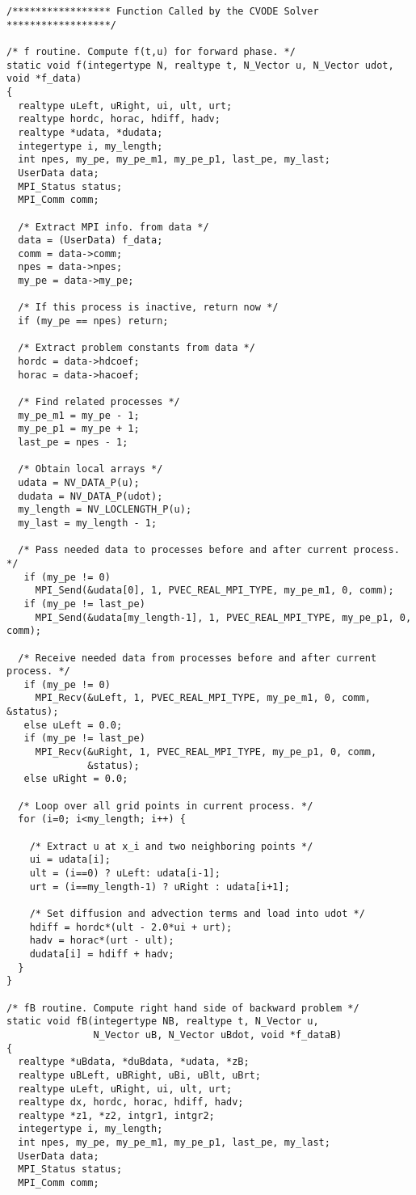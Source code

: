 \begin{verbatim}
/***************** Function Called by the CVODE Solver ******************/

/* f routine. Compute f(t,u) for forward phase. */
static void f(integertype N, realtype t, N_Vector u, N_Vector udot, void *f_data)
{
  realtype uLeft, uRight, ui, ult, urt;
  realtype hordc, horac, hdiff, hadv;
  realtype *udata, *dudata;
  integertype i, my_length;
  int npes, my_pe, my_pe_m1, my_pe_p1, last_pe, my_last;
  UserData data;
  MPI_Status status;
  MPI_Comm comm;

  /* Extract MPI info. from data */
  data = (UserData) f_data;
  comm = data->comm;
  npes = data->npes;
  my_pe = data->my_pe;
  
  /* If this process is inactive, return now */
  if (my_pe == npes) return;

  /* Extract problem constants from data */
  hordc = data->hdcoef;
  horac = data->hacoef;

  /* Find related processes */
  my_pe_m1 = my_pe - 1;
  my_pe_p1 = my_pe + 1;
  last_pe = npes - 1;

  /* Obtain local arrays */
  udata = NV_DATA_P(u);
  dudata = NV_DATA_P(udot);
  my_length = NV_LOCLENGTH_P(u);
  my_last = my_length - 1;

  /* Pass needed data to processes before and after current process. */
   if (my_pe != 0)
     MPI_Send(&udata[0], 1, PVEC_REAL_MPI_TYPE, my_pe_m1, 0, comm);
   if (my_pe != last_pe)
     MPI_Send(&udata[my_length-1], 1, PVEC_REAL_MPI_TYPE, my_pe_p1, 0, comm);   

  /* Receive needed data from processes before and after current process. */
   if (my_pe != 0)
     MPI_Recv(&uLeft, 1, PVEC_REAL_MPI_TYPE, my_pe_m1, 0, comm, &status);
   else uLeft = 0.0;
   if (my_pe != last_pe)
     MPI_Recv(&uRight, 1, PVEC_REAL_MPI_TYPE, my_pe_p1, 0, comm,
              &status);   
   else uRight = 0.0;

  /* Loop over all grid points in current process. */
  for (i=0; i<my_length; i++) {

    /* Extract u at x_i and two neighboring points */
    ui = udata[i];
    ult = (i==0) ? uLeft: udata[i-1];
    urt = (i==my_length-1) ? uRight : udata[i+1];

    /* Set diffusion and advection terms and load into udot */
    hdiff = hordc*(ult - 2.0*ui + urt);
    hadv = horac*(urt - ult);
    dudata[i] = hdiff + hadv;
  }
}

/* fB routine. Compute right hand side of backward problem */
static void fB(integertype NB, realtype t, N_Vector u, 
               N_Vector uB, N_Vector uBdot, void *f_dataB)
{
  realtype *uBdata, *duBdata, *udata, *zB;
  realtype uBLeft, uBRight, uBi, uBlt, uBrt;
  realtype uLeft, uRight, ui, ult, urt;
  realtype dx, hordc, horac, hdiff, hadv;
  realtype *z1, *z2, intgr1, intgr2;
  integertype i, my_length;
  int npes, my_pe, my_pe_m1, my_pe_p1, last_pe, my_last;
  UserData data;
  MPI_Status status;
  MPI_Comm comm;


\end{verbatim}
